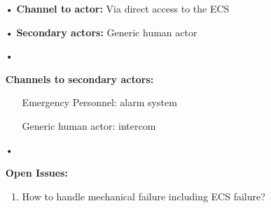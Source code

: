 \documentclass[12pt]{article}
\begin{document}
\begin{itemize}
			\item[•] \textbf{Channel to actor:} Via direct access to the ECS
			\item[•] \textbf{Secondary actors:} Generic human actor
			\item[•]{\textbf{Channels to secondary actors:}
			    \begin{itemize}
					\item[] Emergency Personnel: alarm system
					\item[] Generic human actor: intercom
			    \end{itemize}}
			\item[•]{\textbf{Open Issues:}
				\begin{enumerate}
					\item How to handle mechanical failure including ECS failure?
				\end{enumerate}} 
		\end{itemize}
	
\end{document}

